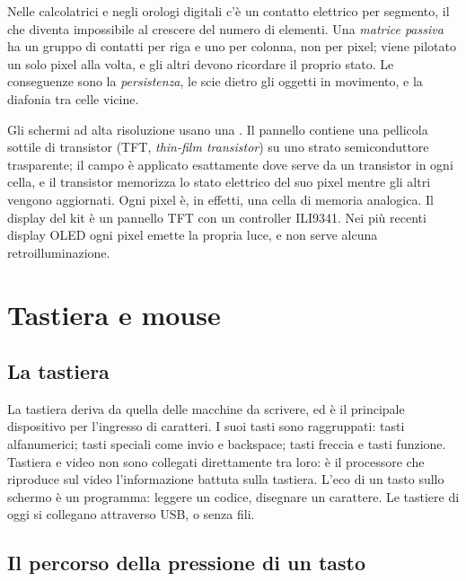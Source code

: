 Nelle calcolatrici e negli orologi digitali c'è un contatto elettrico per
segmento, il che diventa impossibile al crescere del numero di elementi. Una
\emph{matrice passiva} ha un gruppo di contatti per riga e uno per colonna,
non per pixel; viene pilotato un solo pixel alla volta, e gli altri devono
ricordare il proprio stato. Le conseguenze sono la \emph{persistenza}, le scie
dietro gli oggetti in movimento, e la diafonia tra celle vicine.

Gli schermi ad alta risoluzione usano una . Il pannello
contiene una pellicola sottile di transistor (TFT, \emph{thin-film
transistor}) su uno strato semiconduttore trasparente; il campo è applicato
esattamente dove serve da un transistor in ogni cella, e il transistor
memorizza lo stato elettrico del suo pixel mentre gli altri vengono
aggiornati. Ogni pixel è, in effetti, una cella di memoria analogica. Il
display del kit è un pannello TFT con un controller ILI9341. Nei più recenti
display OLED ogni pixel emette la propria luce, e non serve alcuna
retroilluminazione.

\section{Tastiera e mouse}

\subsection{La tastiera}

La tastiera deriva da quella delle macchine da scrivere, ed è il principale
dispositivo per l'ingresso di caratteri. I suoi tasti sono raggruppati: tasti
alfanumerici; tasti speciali come invio e backspace; tasti freccia e tasti
funzione. Tastiera e video non sono collegati direttamente tra loro: è il
processore che riproduce sul video l'informazione battuta sulla tastiera.
L'eco di un tasto sullo schermo è un programma: leggere un codice, disegnare
un carattere. Le tastiere di oggi si collegano attraverso USB, o senza fili.

\subsection{Il percorso della pressione di un tasto}

